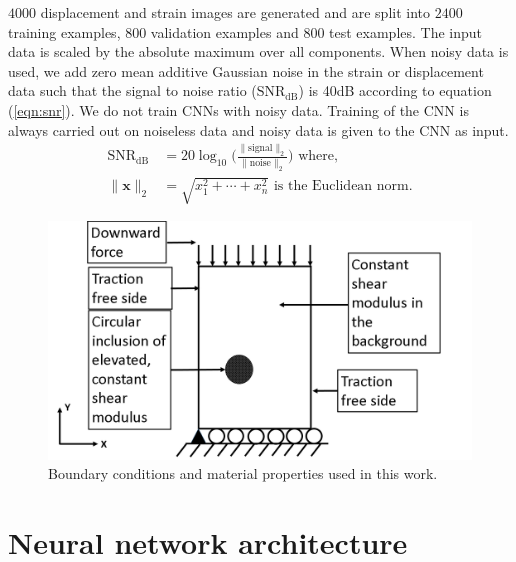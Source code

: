 \documentclass[12pt]{article}
\begin{document}
$4000$ displacement and strain images are generated and are split into $2400$ training examples, $800$ validation examples and $800$ test examples. The input data is scaled by the absolute maximum over all components. When noisy data is used, we add zero mean additive Gaussian noise in the strain or displacement data such that the signal to noise ratio ($\text{SNR}_{\text{dB}}$) is 40dB according to equation (\ref{eqn:snr}). We do not train CNNs with noisy data. Training of the CNN is always carried out on noiseless data and noisy data is given to the CNN as input.
\begin{subequations}
\begin{align}
  \text{SNR}_{\text{dB}} &= 20\log_{10}{\Bigg (}\frac{\|\text{signal}\|_{2}}{\|\text{noise}\|_{2}}{\Bigg )} \label{eqn:snr} \text{ where, }\\
  \|\mathbf{x}\|_{2} &= \sqrt{x_{1}^{2}+\cdots+x_{n}^2}  \text{ is the Euclidean norm.}   \label{eqn:eucnorm}
\end{align}
\end{subequations}  
%
\begin{figure}[!h] 
   \centering
    \includegraphics[totalheight=5cm]{Figures/bc.png}
  \caption{\label{fig:bc}Boundary conditions and material properties used in this work. }
\end{figure}
%
\section{Neural network architecture}
\end{document}
